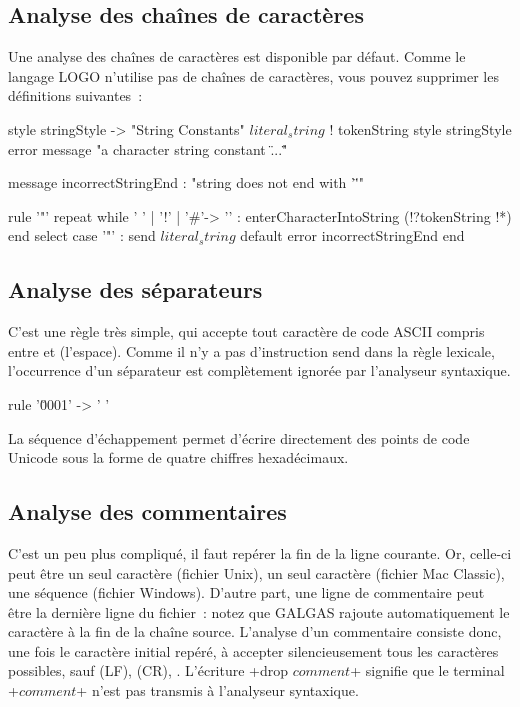 \subsection{Analyse des chaînes de caractères}
Une analyse des chaînes de caractères est disponible par défaut. Comme le langage LOGO n’utilise pas de chaînes de caractères, vous pouvez supprimer les définitions suivantes~:

\begin{galgas}
style stringStyle -> "String Constants"
$literal_string$ ! tokenString style stringStyle %
                   error message "a character string constant \"...\""

message incorrectStringEnd : "string does not end with '\"'"

rule '"' {
  repeat
  while ' ' | '!' | '#'-> '\uFFFD' :
    enterCharacterIntoString (!?tokenString !*)
  end
  select
  case '"' :
    send $literal_string$
  default
    error incorrectStringEnd
  end
}
\end{galgas}

\subsection{Analyse des séparateurs}
C'est une règle très simple, qui accepte tout caractère de code ASCII compris entre  et  (l'espace). Comme il n'y a pas d'instruction send dans la règle lexicale, l'occurrence d'un séparateur est complètement ignorée par l'analyseur syntaxique.
\begin{galgas}
rule '\u0001' -> ' ' {
}
\end{galgas}
La séquence d'échappement  permet d'écrire directement des points de code Unicode sous la forme de quatre chiffres hexadécimaux.

\subsection{Analyse des commentaires}
C'est un peu plus compliqué, il faut repérer la fin de la ligne courante. Or, celle-ci peut être un seul caractère  (fichier Unix), un seul caractère  (fichier Mac Classic), une séquence  (fichier Windows). D'autre part, une ligne de commentaire peut être la dernière ligne du fichier~: notez que GALGAS rajoute automatiquement le caractère \tpp{\textquotesingle\textbackslash 0\textquotesingle} à la fin de la chaîne source. L'analyse d'un commentaire consiste donc, une fois le caractère initial \tpp{\textquotesingle\textbackslash\#\textquotesingle} repéré, à accepter silencieusement tous les caractères possibles, sauf  (LF),  (CR), . L’écriture \ggs+drop $comment$+ signifie que le terminal \ggs+$comment$+ n’est pas transmis à l’analyseur syntaxique.

